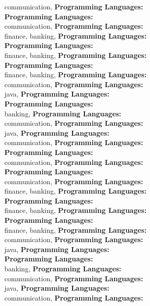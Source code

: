 communication, \textbf{Programming Languages:} \\
\textbf{Programming Languages:} \\
communication, \textbf{Programming Languages:} \\
finance, banking, \textbf{Programming Languages:} \\
\textbf{Programming Languages:} \\
finance, banking, \textbf{Programming Languages:} \\
\textbf{Programming Languages:} \\
finance, banking, \textbf{Programming Languages:} \\
communication, \textbf{Programming Languages:} \\
java, \textbf{Programming Languages:} \\
\textbf{Programming Languages:} \\
banking, \textbf{Programming Languages:} \\
communication, \textbf{Programming Languages:} \\
java, \textbf{Programming Languages:} \\
communication, \textbf{Programming Languages:} \\
\textbf{Programming Languages:} \\
communication, \textbf{Programming Languages:} \\
\textbf{Programming Languages:} \\
communication, \textbf{Programming Languages:} \\
finance, banking, \textbf{Programming Languages:} \\
\textbf{Programming Languages:} \\
finance, banking, \textbf{Programming Languages:} \\
\textbf{Programming Languages:} \\
finance, banking, \textbf{Programming Languages:} \\
communication, \textbf{Programming Languages:} \\
java, \textbf{Programming Languages:} \\
\textbf{Programming Languages:} \\
banking, \textbf{Programming Languages:} \\
communication, \textbf{Programming Languages:} \\
java, \textbf{Programming Languages:} \\
communication, \textbf{Programming Languages:} \\
